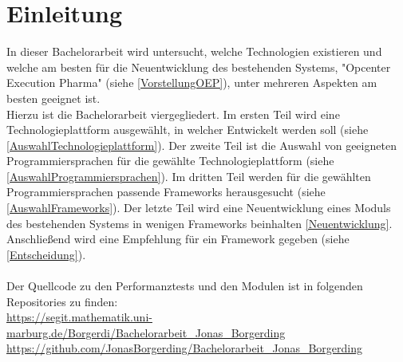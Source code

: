 \documentclass[ngerman]{article}
\begin{document}
    \tableofcontents\newpage
    \pagestyle{fancy}
    \renewcommand{\sectionmark}[1]{\markright{#1}}
    \fancyhf{}
    \fancyfoot[C]{\thepage}
    \setcounter{page}{1}
    \section{Einleitung}
    \label{Einleitung}
    In dieser Bachelorarbeit wird untersucht, welche Technologien existieren und welche am besten für die Neuentwicklung des bestehenden Systems, "Opcenter Execution Pharma" (siehe \ref{VorstellungOEP}), unter mehreren Aspekten am besten geeignet ist.\\
    Hierzu ist die Bachelorarbeit viergegliedert. Im ersten Teil wird eine Technologieplattform ausgewählt, in welcher Entwickelt werden soll (siehe \ref{AuswahlTechnologieplattform}). Der zweite Teil ist die Auswahl von geeigneten Programmiersprachen für die gewählte Technologieplattform (siehe \ref{AuswahlProgrammiersprachen}). Im dritten Teil werden für die gewählten Programmiersprachen passende Frameworks herausgesucht (siehe \ref{AuswahlFrameworks}). Der letzte Teil wird eine Neuentwicklung eines Moduls des bestehenden Systems in wenigen Frameworks beinhalten \ref{Neuentwicklung}. Anschließend wird eine Empfehlung für ein Framework gegeben (siehe \ref{Entscheidung}).\\\\
    Der Quellcode zu den Performanztests und den Modulen ist in folgenden Repositories zu finden:\\
    \url{https://segit.mathematik.uni-marburg.de/Borgerdi/Bachelorarbeit_Jonas_Borgerding}\\
    \url{https://github.com/JonasBorgerding/Bachelorarbeit_Jonas_Borgerding}\\
    \newpage\noindent
\end{document}
